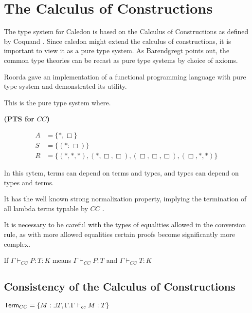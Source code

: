 \section{The Calculus of Constructions}

The type system for Caledon is based on the Calculus of Constructions as defined by Coquand \citep{coquand1986calculus}.
Since caledon might extend the calculus of constructions, it is important to view it as a pure type system. 
As Barendgregt points out, the common type theories can be recast as pure type systems
by choice of axioms. 

Roorda \citep{roorda2001pure} gave an implementation of a functional programming language with 
pure type system and demonstrated its utility.

This is the pure type system where.

\begin{definition}
\textbf{(PTS for $CC$)}

\begin{align}
A &= \{ *, \Box \}
\\
S &= \{ (* : \Box) \}
\\
R &= \{ (*,*,*),(*,\Box,\Box),(\Box,\Box,\Box),(\Box,*,*)\}
\end{align}  

\label{coc:types}
\end{definition}

In this sytem, terms can depend on terms and types, 
and types can depend on types and terms.  

It has the well known strong normalization property, implying the termination of 
all lambda terms typable by $CC$ \citep{Geuvers94ashort} \citep{geuvers1991modular}.

It is necessary to be careful with the types of equalities allowed in the conversion rule, 
as with more allowed equalities certain proofs
become significantly more complex.

\begin{definition}
If $\Gamma \vdash_{CC} P : T : K$ means $\Gamma \vdash_{CC} P : T$ and $\Gamma \vdash_{CC} T : K$
\end{definition}


\subsection{Consistency of the Calculus of Constructions}

\begin{definition}
$ \mathsf{Term}_{CC}  = \{ M : \exists T,\Gamma . \Gamma \vdash_{cc} M : T \}$
\end{definition}


